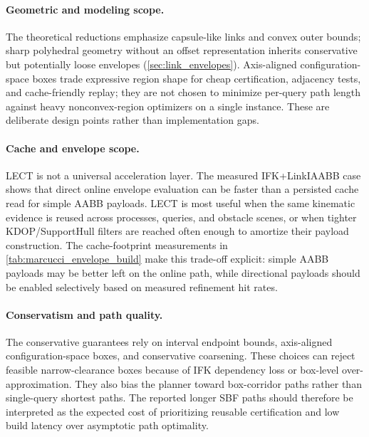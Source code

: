 \documentclass[journal]{IEEEtran}
\begin{document}
\paragraph{Geometric and modeling scope.}
The theoretical reductions emphasize capsule-like links and convex outer bounds;
sharp polyhedral geometry without an offset representation inherits conservative
but potentially loose envelopes (\cref{sec:link_envelopes}). Axis-aligned
configuration-space boxes trade expressive region shape for cheap certification,
adjacency tests, and cache-friendly replay; they are not chosen to minimize
per-query path length against heavy nonconvex-region optimizers on a single
instance. These are deliberate design points rather than implementation gaps.

\paragraph{Cache and envelope scope.}
LECT is not a universal acceleration layer. The measured IFK+LinkIAABB case
shows that direct online envelope evaluation can be faster than a persisted
cache read for simple AABB payloads. LECT is most useful when the same
kinematic evidence is reused across processes, queries, and obstacle scenes, or
when tighter KDOP/SupportHull filters are reached often enough to amortize their
payload construction. The cache-footprint measurements in
\cref{tab:marcucci_envelope_build} make this trade-off explicit: simple AABB
payloads may be better left on the online path, while directional payloads
should be enabled selectively based on measured refinement hit rates.

\paragraph{Conservatism and path quality.}
The conservative guarantees rely on interval endpoint bounds, axis-aligned
configuration-space boxes, and conservative coarsening. These choices can reject
feasible narrow-clearance boxes because of IFK dependency loss or box-level
over-approximation. They also bias the planner toward box-corridor paths rather
than single-query shortest paths. The reported longer SBF paths should therefore
be interpreted as the expected cost of prioritizing reusable certification and
low build latency over asymptotic path optimality.
\end{document}
